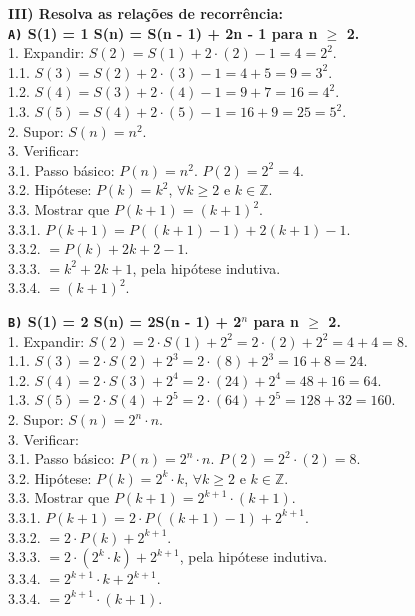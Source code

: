 \documentclass[12pt, a4paper]{article}
\newcommand{\Z}{\mathbb{Z}}
\newcommand\tab[1][1cm]{\hspace*{#1}}
\begin{document}
\begin{flushleft}
\pagebreak
\textbf{III) Resolva as relações de recorrência: \\}
\vskip5mm
\textbf{\textbf{\texttt{A)}} S(1) = 1 \tab S(n) = S(n - 1) + 2n - 1 para n $\geq$ 2.\\}
\textsf{1. Expandir: $S(2) = S(1) + 2 \cdot (2) - 1 = 4 = 2^2$. 
\\ \tab 1.1. \tab[0.37cm] $S(3) = S(2) + 2 \cdot (3) - 1 = 4 + 5 = 9 = 3^2$.
\\ \tab 1.2. \tab[0.37cm] $S(4) = S(3) + 2 \cdot (4) - 1 = 9 + 7 = 16 = 4^2$.
\\ \tab 1.3. \tab[0.37cm] $S(5) = S(4) + 2 \cdot (5) - 1 = 16 + 9 = 25 = 5^2$.
\\2. Supor: $S(n) = n^2$.
\\3. Verificar: 
\\ \tab 3.1. Passo básico: $P(n) = n^2$. $P(2) = 2^2 = 4$.
\\ \tab 3.2. Hipótese: $P(k) = k^2$, $ \forall k \geq 2$ e $k \in \Z$.
\\ \tab 3.3. Mostrar que $P(k+1) = \boxed{(k+1)^2}$.
\\ \tab \tab 3.3.1. $P(k+1) = P((k+1) - 1) + 2(k+1) - 1$.
\\ \tab \tab 3.3.2. \tab \tab[0.6cm] $= P(k) + 2k + 2 - 1$.
\\ \tab \tab 3.3.3. \tab \tab[0.6cm] $= k^2 + 2k + 1$, pela hipótese indutiva.
\\ \tab \tab 3.3.4. \tab \tab[0.6cm] $= \boxed{(k + 1)^2}$.}

\vskip10mm

\textbf{\textbf{\texttt{B)}} S(1) = 2 \tab S(n) = 2S(n - 1) + 2$^n$ para n $\geq$ 2.\\}
\textsf{1. Expandir: $S(2) = 2 \cdot S(1) + 2^2 = 2 \cdot (2) + 2^2 = 4 + 4 = 8$. 
\\ \tab 1.1. \tab[0.37cm] $ S(3) = 2 \cdot S(2) + 2^3 = 2 \cdot (8) + 2^3 = 16 + 8 = 24 $.
\\ \tab 1.2. \tab[0.37cm] $ S(4) = 2 \cdot S(3) + 2^4 = 2 \cdot (24) + 2^4 = 48 + 16 = 64 $.
\\ \tab 1.3. \tab[0.37cm] $ S(5) = 2 \cdot S(4) + 2^5 = 2 \cdot (64) + 2^5 = 128 + 32 = 160 $.
\\2. Supor: $S(n) = 2^n \cdot n$.
\\3. Verificar: 
\\ \tab 3.1. Passo básico: $P(n) = 2^n \cdot n$. $ P(2) = 2^2 \cdot (2) = 8 $.
\\ \tab 3.2. Hipótese: $P(k) = 2^k \cdot k $, $ \forall k \geq 2$ e $k \in \Z$.
\\ \tab 3.3. Mostrar que $P(k+1) = \boxed{ 2^{k+1} \cdot (k+1) }$.
\\ \tab \tab 3.3.1. $P(k+1) = 2 \cdot P((k+1)-1) + 2^{k+1}$.
\\ \tab \tab 3.3.2. \tab \tab[0.6cm] $= 2 \cdot P(k) + 2^{k+1}$.
\\ \tab \tab 3.3.3. \tab \tab[0.6cm] $= 2 \cdot (2^k \cdot k) + 2^{k+1}$, pela hipótese indutiva.
\\ \tab \tab 3.3.4. \tab \tab[0.6cm] $= 2^{k+1} \cdot k + 2^{k+1}$.
\\ \tab \tab 3.3.4. \tab \tab[0.6cm] $= \boxed{2^{k+1} \cdot (k+1)}$.}



\end{flushleft}
\end{document}
